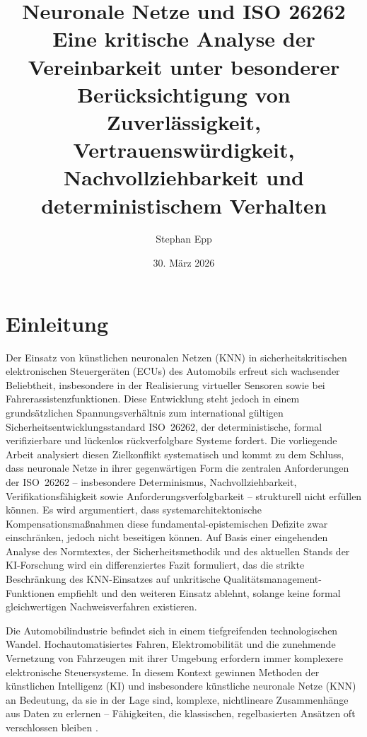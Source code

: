 ﻿\documentclass[12pt,a4paper]{article}
\title{
  {\bfseries Neuronale Netze und ISO 26262}\\
  {\Large Eine kritische Analyse der Vereinbarkeit unter besonderer Ber\"ucksichtigung von Zuverl\"assigkeit, Vertrauensw\"urdigkeit, Nachvollziehbarkeit und deterministischem Verhalten}}
\author{Stephan Epp}
\date{30. März 2026}
\begin{document}
\maketitle
\tableofcontents
\newpage

\section{Einleitung}
\label{sec:einleitung}
Der Einsatz von k\"unstlichen neuronalen Netzen (KNN) in sicherheitskritischen
elektronischen Steuerger\"aten (ECUs) des Automobils erfreut sich wachsender
Beliebtheit, insbesondere in der Realisierung virtueller Sensoren sowie bei
Fahrerassistenzfunktionen. Diese Entwicklung steht jedoch in einem grunds\"atzlichen
Spannungsverh\"altnis zum international g\"ultigen Sicherheitsentwicklungsstandard
ISO~26262, der deterministische, formal verifizierbare und l\"uckenlos r\"uckverfolgbare
Systeme fordert. Die vorliegende Arbeit analysiert diesen Zielkonflikt systematisch und
kommt zu dem Schluss, dass neuronale Netze in ihrer gegenw\"artigen Form die zentralen
Anforderungen der ISO~26262 -- insbesondere Determinismus, Nachvollziehbarkeit,
Verifikationsf\"ahigkeit sowie Anforderungsverfolgbarkeit -- strukturell nicht erf\"ullen
k\"onnen. Es wird argumentiert, dass systemarchitektonische
Kompensationsma\ss{}nahmen diese fundamental-epistemischen Defizite zwar
einschr\"anken, jedoch nicht beseitigen k\"onnen. Auf Basis einer eingehenden
Analyse des Normtextes, der Sicherheitsmethodik und des aktuellen Stands der
KI-Forschung wird ein differenziertes Fazit formuliert, das die strikte
Beschr\"ankung des KNN-Einsatzes auf unkritische Qualit\"atsmanagement-Funktionen
empfiehlt und den weiteren Einsatz ablehnt, solange keine formal gleichwertigen
Nachweisverfahren existieren.

Die Automobilindustrie befindet sich in einem tiefgreifenden technologischen Wandel.
Hochautomatisiertes Fahren, Elektromobilit\"at und die zunehmende Vernetzung von
Fahrzeugen mit ihrer Umgebung erfordern immer komplexere elektronische Steuersysteme.
In diesem Kontext gewinnen Methoden der k\"unstlichen Intelligenz (KI) und insbesondere
k\"unstliche neuronale Netze (KNN) an Bedeutung, da sie in der Lage sind, komplexe,
nichtlineare Zusammenh\"ange aus Daten zu erlernen -- F\"ahigkeiten, die klassischen,
regelbasierten Ans\"atzen oft verschlossen bleiben \cite{LeCun2015}.
\end{document}
